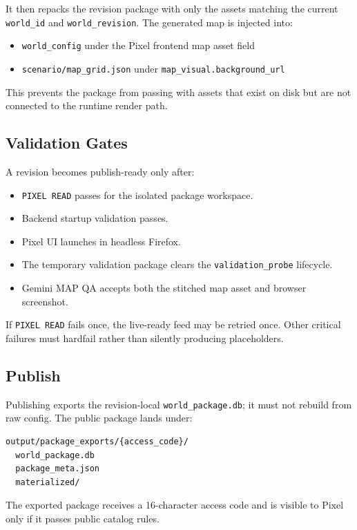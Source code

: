 \documentclass[11pt]{article}
\begin{document}
It then repacks the revision package with only the assets matching the current \texttt{world\_id} and \texttt{world\_revision}. The generated map is injected into:

\begin{itemize}
  \item \texttt{world\_config} under the Pixel frontend map asset field
  \item \texttt{scenario/map\_grid.json} under \texttt{map\_visual.background\_url}
\end{itemize}

This prevents the package from passing with assets that exist on disk but are not connected to the runtime render path.

\subsection{Validation Gates}

A revision becomes publish-ready only after:

\begin{itemize}
  \item \texttt{PIXEL READ} passes for the isolated package workspace.
  \item Backend startup validation passes.
  \item Pixel UI launches in headless Firefox.
  \item The temporary validation package clears the \texttt{validation\_probe} lifecycle.
  \item Gemini MAP QA accepts both the stitched map asset and browser screenshot.
\end{itemize}

If \texttt{PIXEL READ} fails once, the live-ready feed may be retried once. Other critical failures must hardfail rather than silently producing placeholders.

\subsection{Publish}

Publishing exports the revision-local \texttt{world\_package.db}; it must not rebuild from raw config. The public package lands under:

\begin{verbatim}
output/package_exports/{access_code}/
  world_package.db
  package_meta.json
  materialized/
\end{verbatim}

The exported package receives a 16-character access code and is visible to Pixel only if it passes public catalog rules.
\end{document}
